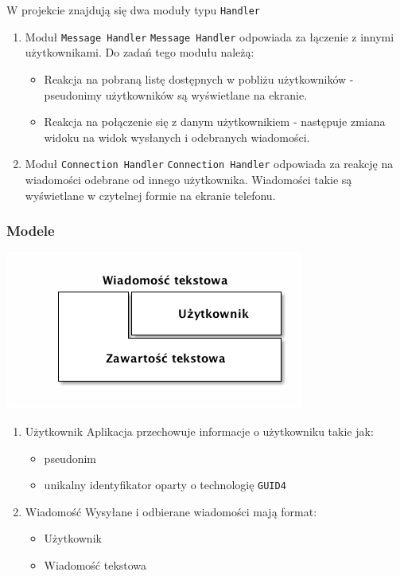 \documentclass[a4paper, titlepage]{article}
\begin{document}
W projekcie znajdują się dwa moduły typu \texttt{Handler}
\begin{enumerate}
\item Moduł \texttt{Message Handler}
\texttt{Message Handler} odpowiada za łączenie z innymi użytkownikami.
Do zadań tego modułu należą:
\begin{itemize}
\item Reakcja na pobraną listę dostępnych w pobliżu użytkowników - pseudonimy użytkowników są wyświetlane na ekranie.
\item Reakcja na połączenie się z danym użytkownikiem - następuje zmiana widoku na widok wysłanych i odebranych wiadomości.
\end{itemize}
\item Moduł \texttt{Connection Handler}
     \texttt{Connection Handler} odpowiada za reakcję na wiadomości odebrane od innego użytkownika. Wiadomości takie są wyświetlane w czytelnej formie na ekranie telefonu.
\end{enumerate}
\subsubsection{Modele}
\label{sec-1-2-4}

\includegraphics[width=.9\linewidth]{models.png}

\begin{enumerate}
\item Użytkownik
\label{sec-1-2-4-1}
Aplikacja przechowuje informacje o użytkowniku takie jak:
\begin{itemize}
\item pseudonim
\item unikalny identyfikator oparty o technologię \texttt{GUID4}
\end{itemize}
\item Wiadomość
\label{sec-1-2-4-2}
Wysyłane i odbierane wiadomości mają format:
\begin{itemize}
\item Użytkownik
\item Wiadomość tekstowa
\end{itemize}
\end{enumerate}
\end{document}
